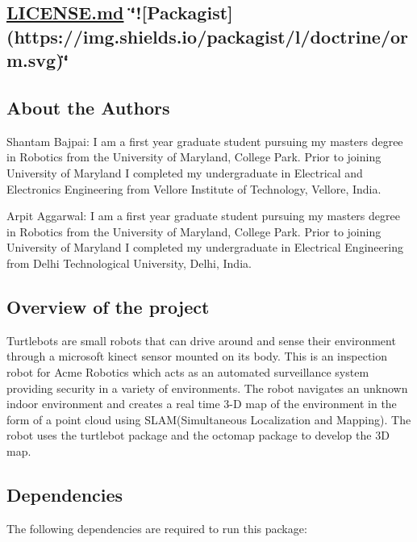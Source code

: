 \href{https://travis-ci.org/arp95/enpm808x_turtlebot_navigator}{\tt } \href{https://coveralls.io/github/arp95/enpm808x_turtlebot_navigator?branch=master}{\tt } \subsection*{\hyperlink{_l_i_c_e_n_s_e_8md}{L\+I\+C\+E\+N\+S\+E.\+md} \char`\"{}!\mbox{[}\+Packagist\mbox{]}(https\+://img.\+shields.\+io/packagist/l/doctrine/orm.\+svg)\char`\"{} }

\subsection*{About the Authors}

Shantam Bajpai\+: I am a first year graduate student pursuing my masters degree in Robotics from the University of Maryland, College Park. Prior to joining University of Maryland I completed my undergraduate in Electrical and Electronics Engineering from Vellore Institute of Technology, Vellore, India.

Arpit Aggarwal\+: I am a first year graduate student pursuing my masters degree in Robotics from the University of Maryland, College Park. Prior to joining University of Maryland I completed my undergraduate in Electrical Engineering from Delhi Technological University, Delhi, India.

\subsection*{Overview of the project}

Turtlebots are small robots that can drive around and sense their environment through a microsoft kinect sensor mounted on its body. This is an inspection robot for Acme Robotics which acts as an automated surveillance system providing security in a variety of environments. The robot navigates an unknown indoor environment and creates a real time 3-\/D map of the environment in the form of a point cloud using S\+L\+A\+M(\+Simultaneous Localization and Mapping). The robot uses the turtlebot package and the octomap package to develop the 3D map.

\subsection*{Dependencies}

The following dependencies are required to run this package\+:


